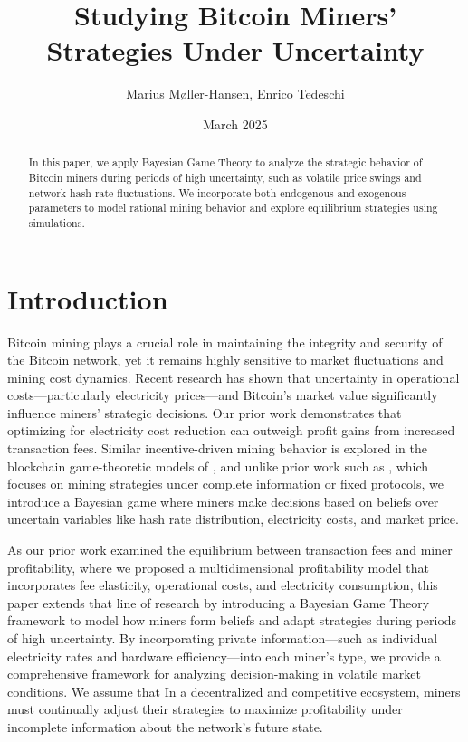 \documentclass[12pt]{article}
\title{Studying Bitcoin Miners' Strategies Under Uncertainty}
\author{Marius M{\o}ller-Hansen, Enrico Tedeschi}
\affil{UiT - The Arctic University of Norway}
\date{March 2025}
\begin{document}
\maketitle

\begin{abstract}
	In this paper, we apply Bayesian Game Theory to analyze the strategic behavior of Bitcoin miners during periods of high uncertainty, such as volatile price swings and network hash rate fluctuations. We incorporate both endogenous and exogenous parameters to model rational mining behavior and explore equilibrium strategies using simulations.
\end{abstract}

\section{Introduction}
Bitcoin mining plays a crucial role in maintaining the integrity and security of the Bitcoin network, yet it remains highly sensitive to market fluctuations and mining cost dynamics. Recent research has shown that uncertainty in operational costs—particularly electricity prices—and Bitcoin's market value significantly influence miners' strategic decisions. Our prior work \cite{tedeschi2024mining} demonstrates that optimizing for electricity cost reduction can outweigh profit gains from increased transaction fees. Similar incentive-driven mining behavior is explored in the blockchain game-theoretic models of \citeauthor{lewenberg2015inclusive} , and unlike prior work such as \citeauthor{kiayias2016blockchain}, which focuses on mining strategies under complete information or fixed protocols, we introduce a Bayesian game where miners make decisions based on beliefs over uncertain variables like hash rate distribution, electricity costs, and market price.


As our prior work examined the equilibrium between transaction fees and miner profitability, where we proposed a multidimensional profitability model that incorporates fee elasticity, operational costs, and electricity consumption, this paper extends that line of research by introducing a Bayesian Game Theory framework to model how miners form beliefs and adapt strategies during periods of high uncertainty. By incorporating private information—such as individual electricity rates and hardware efficiency—into each miner's type, we provide a comprehensive framework for analyzing decision-making in volatile market conditions. We assume that In a decentralized and competitive ecosystem, miners must continually adjust their strategies to maximize profitability under incomplete information about the network's future state.
\end{document}
